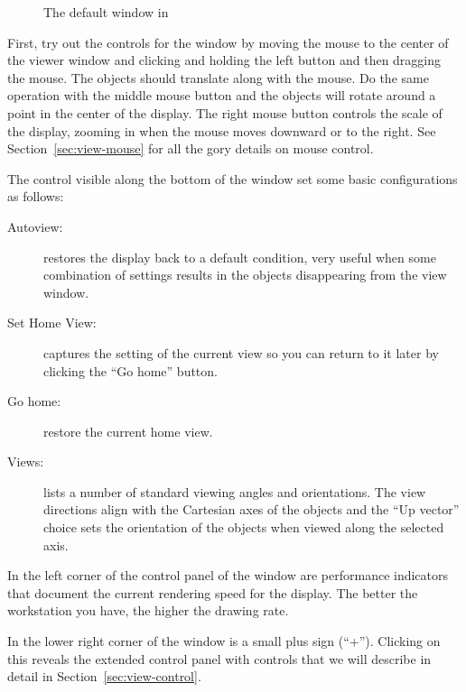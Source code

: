 \begin{figure}[htb]
  \begin{makeimage}
  \end{makeimage}
  \caption{\label{fig:viewwindow} The default \viewer{} window in \SR{}}
\end{figure}


First, try out the controls for the \graphics{} window by moving the mouse
to the center of the viewer window and clicking and holding the left button
and then dragging the mouse.  The objects should translate along with the
mouse.  Do the same operation with the middle mouse button and the objects
will rotate around a point in the center of the display.  The right mouse
button controls the scale of the display, zooming in  when the mouse moves
downward or to the right.  See Section~\ref{sec:view-mouse} for all the
gory details on mouse control.

The control visible along the bottom of the \viewer{} window set some basic
configurations as follows:
%
\begin{description}
  \item [Autoview: ] restores the display back to a default condition, very
        useful when some combination of settings results in the objects
        disappearing from the view window.
  \item [Set Home View: ] captures the setting of the current view so you
        can return to it later by clicking the ``Go home'' button.
  \item [Go home: ] restore the current home view.
  \item [Views: ] lists a number of standard viewing angles and
        orientations.  The view directions align with the Cartesian axes
        of the objects and the ``Up vector'' choice sets the orientation of
        the objects when viewed along the selected axis.
\end{description}

In the left corner of the control panel of the \viewer{} window are
performance indicators that document the current rendering speed for the
display.  The better the workstation you have, the higher the drawing rate.

In the lower right corner of the \viewer{} window is a small plus sign
(``+'').  Clicking on this reveals the extended control panel with controls
that we will describe in detail in Section~\ref{sec:view-control}.



